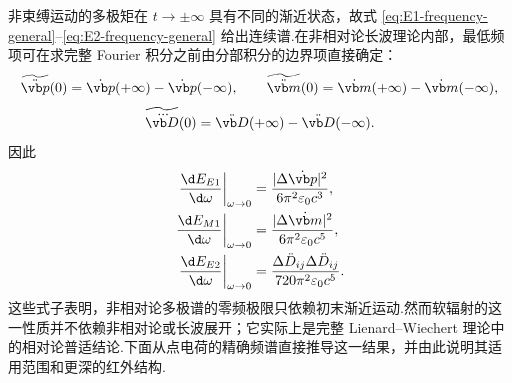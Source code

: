 非束缚运动的多极矩在 $t\to\pm\infty$ 具有不同的渐近状态，故式 \eqref{eq:E1-frequency-general}--\eqref{eq:E2-frequency-general} 给出连续谱.在非相对论长波理论内部，最低频项可在求完整 Fourier 积分之前由分部积分的边界项直接确定：
\begin{equation}
 \widetilde{\ddot{\vb p}}(0)=\dot{\vb p}(+\infty)-\dot{\vb p}(-\infty),
 \qquad
 \widetilde{\ddot{\vb m}}(0)=\dot{\vb m}(+\infty)-\dot{\vb m}(-\infty),
 \label{eq:soft-boundary-dipoles}
\end{equation}
\begin{equation}
 \widetilde{\dddot{\vb D}}(0)=\ddot{\vb D}(+\infty)-\ddot{\vb D}(-\infty).
 \label{eq:soft-boundary-quadrupole}
\end{equation}
因此
\begin{equation}
 \begin{aligned}
 \left.\frac{\d E_{E1}}{\d\omega}\right|_{\omega\to0}
 &=\frac{|\Delta\dot{\vb p}|^2}{6\pi^2\varepsilon_0c^3},\\
 \left.\frac{\d E_{M1}}{\d\omega}\right|_{\omega\to0}
 &=\frac{|\Delta\dot{\vb m}|^2}{6\pi^2\varepsilon_0c^5},\\
 \left.\frac{\d E_{E2}}{\d\omega}\right|_{\omega\to0}
 &=\frac{\Delta\ddot D_{ij}\Delta\ddot D_{ij}}{720\pi^2\varepsilon_0c^5}.
 \end{aligned}
 \label{eq:general-soft-spectrum-boundary-form}
\end{equation}
这些式子表明，非相对论多极谱的零频极限只依赖初末渐近运动.然而软辐射的这一性质并不依赖非相对论或长波展开；它实际上是完整 Lienard--Wiechert 理论中的相对论普适结论.下面从点电荷的精确频谱直接推导这一结果，并由此说明其适用范围和更深的红外结构.


